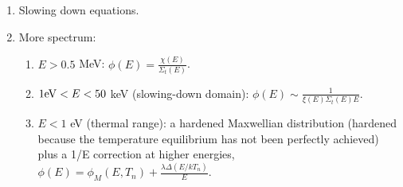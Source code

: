 \documentclass{school-22.211-notes}
\begin{document}
\begin{enumerate}
\item Slowing down equations. 

\item More spectrum: 
  \begin{enumerate}
  \item $E > 0.5$ MeV: $\phi(E) = \frac{\chi(E)}{\Sigma_t(E)}$.
  \item $1 \mathrm{eV} < E < 50$ keV (slowing-down domain): $\phi(E) \sim \frac{1}{\xi(E) \Sigma_t(E) E}$. 
  \item $E < 1$ eV (thermal range): a hardened Maxwellian distribution (hardened because the temperature equilibrium has not been perfectly achieved) plus a 1/E correction at higher energies, $\phi(E) = \phi_M (E, T_n) + \frac{ \lambda \Delta (E/kT_n) }{E}$. 
  \end{enumerate}
\end{enumerate}
\end{document}
